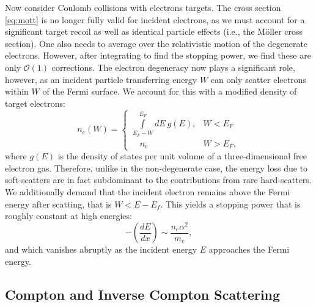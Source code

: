 \documentclass[twocolumn,showpacs,preprintnumbers,amsmath,amssymb,prd]{revtex4}
\newcommand{\OO}{\mathcal{O}}
\def\r{\right)}
\def\l{\left(}
\begin{document}
\begin{appendices}
Now consider Coulomb collisions with electrons targets. 
The cross section \eqref{eq:mott} is no longer fully valid for incident electrons, as we must account for a significant target recoil as well as identical particle effects (i.e., the M{\"o}ller cross section).
One also needs to average over the relativistic motion of the degenerate electrons. 
However, after integrating to find the stopping power, we find these are only $\OO(1)$ corrections. 
The electron degeneracy now plays a significant role, however, as an incident particle transferring energy $W$ can only scatter electrons within $W$ of the Fermi surface.
We account for this with a modified density of target electrons:
\begin{equation}
\label{eq:pauliblocking}
  n_e \l W \r = 
  \begin{cases}
    \displaystyle \int \limits_{E_F - W}^{E_F} dE ~g(E), &  W < E_F  \\
    \quad             n_e                                &  W > E_F,
  \end{cases}
\end{equation}
where $g(E)$ is the density of states per unit volume of a three-dimensional free electron gas.
Therefore, unlike in the non-degenerate case, the energy loss due to soft-scatters are in fact subdominant to the contributions from rare hard-scatters.
We additionally demand that the incident electron remains above the Fermi energy after scatting, that is $W < E - E_f$. 
This yields a stopping power that is roughly constant at high energies:
\begin{equation}
-\l \frac{dE}{dx} \r \sim \frac{n_e \alpha^2}{m_e},
\end{equation}
and which vanishes abruptly as the incident energy $E$ approaches the Fermi energy. 

\subsection{Compton and Inverse Compton Scattering}


\end{appendices}
\end{document}
